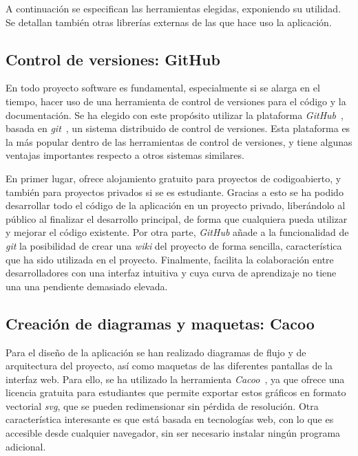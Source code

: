 A continuación se especifican las herramientas elegidas, exponiendo su utilidad.
Se detallan también otras librerías externas de las que hace uso la aplicación.

\subsection*{Control de versiones: GitHub\label{ssec:dp:github}}

En todo proyecto software es fundamental, especialmente si se alarga en el tiempo, hacer uso de una herramienta de control de versiones para el código y la documentación.
Se ha elegido con este propósito utilizar la plataforma \textit{GitHub}~\cite{github}, basada en \textit{git}~\cite{git}, un sistema distribuido de control de versiones.
Esta plataforma es la más popular dentro de las herramientas de control de versiones, y tiene algunas ventajas importantes respecto a otros sistemas similares.

En primer lugar, ofrece alojamiento gratuito para proyectos de \gls{codigoabierto}, y también para proyectos privados si se es estudiante.
Gracias a esto se ha podido desarrollar todo el código de la aplicación en un proyecto privado, liberándolo al público al finalizar el desarrollo principal, de forma que cualquiera pueda utilizar y mejorar el código existente.
Por otra parte, \textit{GitHub} añade a la funcionalidad de \textit{git} la posibilidad de crear una \textit{wiki} del proyecto de forma sencilla, característica que ha sido utilizada en el proyecto.
Finalmente, facilita la colaboración entre desarrolladores con una interfaz intuitiva y cuya curva de aprendizaje no tiene una una pendiente demasiado elevada.

\subsection*{Creación de diagramas y maquetas: Cacoo\label{ssec:dp:cacoo}}

Para el diseño de la aplicación se han realizado diagramas de flujo y de arquitectura del proyecto, así como maquetas de las diferentes pantallas de la interfaz web.
Para ello, se ha utilizado la herramienta \textit{Cacoo}~\cite{cacoo}, ya que ofrece una licencia gratuita para estudiantes que permite exportar estos gráficos en formato vectorial \textit{svg}, que se pueden redimensionar sin pérdida de resolución.
Otra característica interesante es que está basada en tecnologías web, con lo que es accesible desde cualquier navegador, sin ser necesario instalar ningún programa adicional.

